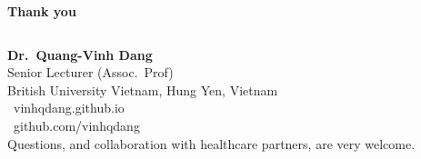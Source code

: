 \documentclass[aspectratio=169,10pt]{beamer}
\begin{document}
\begin{frame}[plain]
\centering\vfill
{\Huge\bfseries\color{tdBlue} Thank you}\\[6mm]
\begin{columns}[c]
\raggedleft
{}
\raggedright\small
\textbf{Dr.\ Quang-Vinh Dang}\\Senior Lecturer (Assoc.\ Prof)\\British University Vietnam, Hung Yen, Vietnam\\[3pt]
\faGlobe\ vinhqdang.github.io\\
\faGithub\ github.com/vinhqdang\\[3pt]
{\scriptsize Questions, and collaboration with healthcare partners, are very welcome.}
\end{columns}
\vfill
\end{frame}
\end{document}
